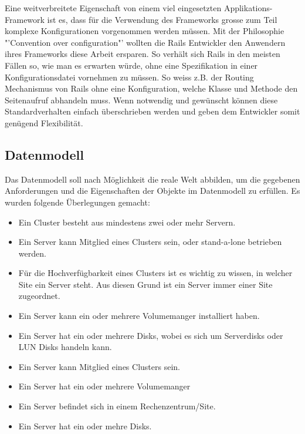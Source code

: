 Eine weitverbreitete Eigenschaft von einem viel eingesetzten Applikations-Framework ist es, dass für die Verwendung des Frameworks grosse zum Teil komplexe Konfigurationen vorgenommen werden müssen. Mit der Philosophie "'Convention over configuration"' wollten die Rails Entwickler den Anwendern ihres Frameworks diese Arbeit ersparen. So verhält sich Rails in den meisten Fällen so, wie man es erwarten würde, ohne eine Spezifikation in einer Konfigurationsdatei vornehmen zu müssen.  So weiss z.B. der Routing Mechanismus von Rails ohne eine Konfiguration, welche Klasse und Methode den Seitenaufruf abhandeln muss. Wenn notwendig und gewünscht können diese Standardverhalten einfach überschrieben werden und geben dem Entwickler somit genügend Flexibilität.


\subsection{Datenmodell}

Das Datenmodell soll nach Möglichkeit die reale Welt abbilden, um die gegebenen Anforderungen und die Eigenschaften der Objekte im Datenmodell zu erfüllen. Es wurden folgende Überlegungen gemacht:

\begin{itemize}
\item Ein Cluster besteht aus mindestens zwei oder mehr Servern.
\item Ein Server kann Mitglied eines Clusters sein, oder stand-a-lone betrieben werden.
\item Für die Hochverfügbarkeit eines Clusters ist es wichtig zu wissen, in welcher Site ein Server steht. Aus diesen Grund ist ein Server immer einer Site zugeordnet.\newline
\end{itemize}


\begin{itemize}
\item Ein Server kann ein oder mehrere Volumemanger installiert haben.
\item Ein Server hat ein oder mehrere Disks, wobei es sich um Serverdisks oder LUN Disks handeln kann.
\item Ein Server kann Mitglied eines Clusters sein.
\item Ein Server hat ein oder mehrere Volumemanger
\item Ein Server befindet sich in einem Rechenzentrum/Site.
\item Ein Server hat ein oder mehre Disks.\newline
\end{itemize}


